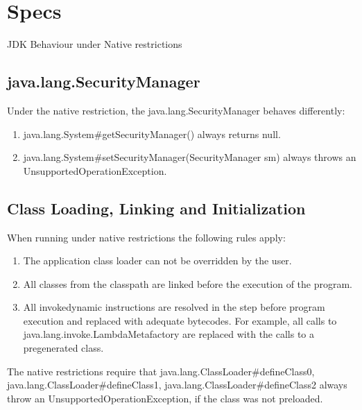 \chapter{Specs}
JDK Behaviour under Native restrictions
\section{java.lang.SecurityManager}
Under the native restriction, the java.lang.SecurityManager behaves differently:
\begin{enumerate}
    \item java.lang.System\#getSecurityManager() always returns null.
    \item java.lang.System\#setSecurityManager(SecurityManager sm) always throws an UnsupportedOperationException. 
\end{enumerate}

\section{Class Loading, Linking and Initialization}
When running under native restrictions the following rules apply:
\begin{enumerate}
    \item The application class loader can not be overridden by the user.
    \item All classes from the classpath are linked before the execution of the program.
    \item All invokedynamic instructions are resolved in the step before program execution and replaced with adequate bytecodes. For example, all calls to java.lang.invoke.LambdaMetafactory are replaced with the calls to a pregenerated class.
\end{enumerate}

The native restrictions require that java.lang.ClassLoader\#defineClass0, java.lang.ClassLoader\#defineClass1, java.lang.ClassLoader\#defineClass2 always throw an UnsupportedOperationException, if the class was not preloaded. 

